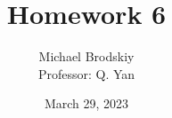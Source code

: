 


\usepackage[dvipsnames,table]{xcolor}
\usepackage{siunitx} %
\usepackage{pgfplots}

\title{Homework 6}
\date{March 29, 2023}
\author{Michael Brodskiy\\ \small Professor: Q. Yan}



\maketitle

\newpage

